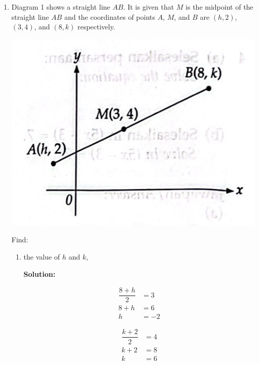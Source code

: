 \documentclass{report}
\newcommand{\sol}{\textbf{Solution:}}
\begin{document}
\begin{enumerate}[leftmargin=*]
\begin{enumerate}
          \end{enumerate}

    \item Diagram 1 shows a straight line $AB$. It is given that $M$ is the midpoint of
          the straight line $AB$ and the coordinates of points $A$, $M$, and $B$ are $(h,
              2)$, $(3, 4)$, and $(8, k)$ respectively.
          \begin{center}
              \includegraphics[scale=0.1]{assets/7.png}
          \end{center}
          Find:
          \begin{enumerate}
              \item the value of $h$ and $k$,

                    \sol{}
                    \vspace{-0.8cm}
                    \begin{multicols}{2}
                        \begin{align*}
                            \dfrac{8 + h}{2} & = 3  \\
                            8 + h            & = 6  \\
                            h                & = -2
                        \end{align*}

                        \begin{align*}
                            \dfrac{k+2}{2} & = 4 \\
                            k+2            & = 8 \\
                            k              & = 6
                        \end{align*}
                    \end{multicols}


\end{enumerate}
\end{enumerate}
\end{document}
